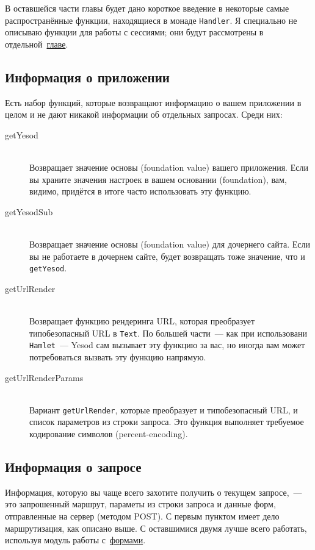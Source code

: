 В оставшейся части главы будет дано короткое введение в некоторые
самые распространённые функции, находящиеся в монаде
\lstinline!Handler!. Я специально не описываю функции для работы с
сессиями; они будут рассмотрены в отдельной~\hyperref[chap:sessions]{главе}.

\subsection{Информация о приложении}
Есть набор функций, которые возвращают информацию о вашем приложении в
целом и не дают никакой информации об отдельных запросах. Среди них:
\begin{description}
\item[getYesod] \hfill \\
Возвращает значение основы (foundation value) вашего приложения. Если вы
храните значения настроек в вашем основании (foundation), вам, видимо,
придётся в итоге часто использовать эту функцию.

\item[getYesodSub] \hfill \\
Возвращает значение основы (foundation value) для дочернего сайта. Если вы
не работаете в дочернем сайте, будет возвращать тоже значение, что и
\lstinline!getYesod!.

\item[getUrlRender] \hfill \\
Возвращает функцию рендеринга URL, которая преобразует типобезопасный
URL в \lstinline!Text!. По большей части~--- как при использовани
\lstinline!Hamlet!~--- Yesod сам вызывает эту функцию за вас, но иногда
вам может потребоваться вызвать эту функцию напрямую.

\item[getUrlRenderParams]  \hfill \\
Вариант \lstinline!getUrlRender!, которые преобразует и
типобезопасный URL, и список параметров из строки запроса. Это функция
выполняет требуемое кодирование символов (percent-encoding).
\end{description}

\subsection{Информация о запросе}
Информация, которую вы чаще всего захотите получить о текущем
запросе,~--- это запрошенный маршрут, параметы из строки запроса и
данные форм, отправленные на сервер (методом POST). С первым пунктом имеет
дело маршрутизация, как описано выше. С оставшимися двумя лучше всего
работать, используя модуль работы с~\hyperref[chap:forms]{формами}.

